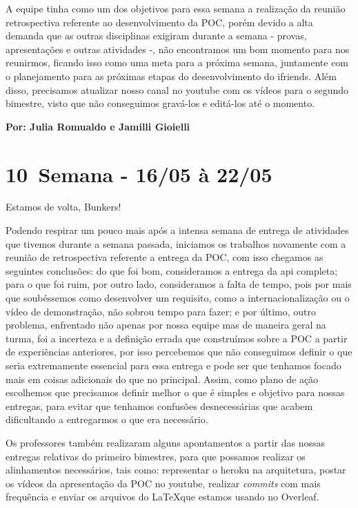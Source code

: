 A equipe tinha como um dos objetivos para essa semana a realização da reunião retrospectiva referente ao desenvolvimento da \gls{POC}, porém devido a alta demanda que as outras disciplinas exigiram durante a semana - provas, apresentações e outras atividades -, não encontramos um bom momento para nos reunirmos, ficando isso como uma meta para a próxima semana, juntamente com o planejamento para as próximas etapas do desenvolvimento do \gls{ifriends}. Além disso, precisamos atualizar nosso canal no \gls{youtube} com os vídeos para o segundo bimestre, visto que não conseguimos gravá-los e editá-los até o momento. 

\textbf{Por: Julia Romualdo e Jamilli Gioielli}

\section{10\textordfeminine \, Semana - 16/05 à 22/05}
Estamos de volta, Bunkers!

Podendo respirar um pouco mais após a intensa semana de entrega de atividades que tivemos durante a semana passada, iniciamos os trabalhos novamente com a reunião de retrospectiva referente a entrega da \gls{POC}, com isso chegamos as seguintes conclusões: do que foi bom, consideramos a entrega da \acs{api} completa;  para o que foi ruim, por outro lado, consideramos a falta de tempo, pois por mais que soubéssemos como desenvolver um requisito, como a internacionalização ou o vídeo de demonstração, não sobrou tempo para fazer; e por último, outro problema, enfrentado não apenas por nossa equipe mas de maneira geral na turma, foi a incerteza e a definição errada que construímos sobre a \gls{POC} a partir de experiências anteriores, por isso percebemos que não conseguimos definir o que seria extremamente essencial para essa entrega e pode ser que tenhamos focado mais em coisas adicionais do que no principal. Assim, como plano de ação escolhemos que precisamos definir melhor o que é simples e objetivo para nossas entregas, para evitar que tenhamos confusões desnecessárias que acabem dificultando a entregarmos o que era necessário.

Os professores também realizaram alguns apontamentos a partir das nossas entregas relativas do primeiro bimestres, para que possamos realizar os alinhamentos necessários, tais como: representar o \gls{heroku} na arquitetura, postar os vídeos da apresentação da \gls{POC} no \gls{youtube}, realizar \textit{commits} com mais frequência e enviar os arquivos do \LaTeX que estamos usando no Overleaf.

